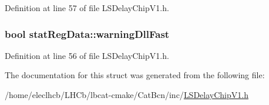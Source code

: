Definition at line 57 of file LSDelayChipV1.h.\hypertarget{structstatRegData_ab2c309fd8e307f289133e11a72d54dc2}{
\subsubsection[{warningDllFast}]{\setlength{\rightskip}{0pt plus 5cm}bool {\bf statRegData::warningDllFast}}}
\label{structstatRegData_ab2c309fd8e307f289133e11a72d54dc2}


Definition at line 56 of file LSDelayChipV1.h.

The documentation for this struct was generated from the following file:\begin{DoxyCompactItemize}
\item 
/home/eleclhcb/LHCb/lbcat-\/cmake/CatBcn/inc/\hyperlink{LSDelayChipV1_8h}{LSDelayChipV1.h}\end{DoxyCompactItemize}
